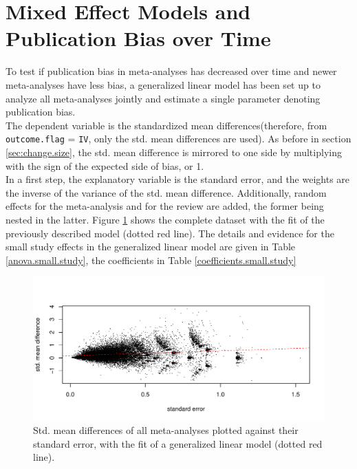 \documentclass[11pt,a4paper,twoside]{book}\usepackage[]{graphicx}\usepackage[]{color}
\newenvironment{knitrout}{}{} %
\begin{document}
\section{Mixed Effect Models and Publication Bias over Time}
To test if publication bias in meta-analyses has decreased over time and newer meta-analyses have less bias, a generalized linear model has been set up to analyze all meta-analyses jointly and estimate a single parameter denoting publication bias.\\
The dependent variable is the standardized mean differences(therefore, from \texttt{outcome.flag} = \texttt{IV}, only the std. mean differences are used). As before in section \ref{sec:change.size}, the std. mean difference is mirrored to one side by multiplying with the sign of the expected side of bias,  or 1. \\
In a first step, the explanatory variable is the standard error, and the weights are the inverse of the variance of the std. mean difference. Additionally, random effects for the meta-analysis and for the review are added, the former being nested in the latter. Figure \ref{fig:smds} shows the complete dataset with the fit of the previously described model (dotted red line). The details and evidence for the small study effects in the generalized linear model are given in Table \ref{anova.small.study}, the coefficients in Table \ref{coefficients.small.study}

\begin{figure}
\begin{knitrout}
\color{fgcolor}

{\centering \includegraphics[width=\textwidth-3cm]{figure/ch03_figunnamed-chunk-29-1} 

}



\end{knitrout}
\caption{Std. mean differences of all meta-analyses plotted against their standard error, with the fit of a generalized linear model (dotted red line).}
\label{fig:smds}
\end{figure}
\end{document}
